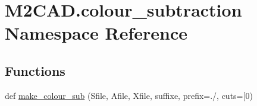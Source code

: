 \hypertarget{namespace_m2_c_a_d_1_1colour__subtraction}{}\section{M2\+C\+A\+D.\+colour\+\_\+subtraction Namespace Reference}
\label{namespace_m2_c_a_d_1_1colour__subtraction}
\subsection*{Functions}
\begin{DoxyCompactItemize}
\item 
def \hyperlink{namespace_m2_c_a_d_1_1colour__subtraction_a5245941117b7e24995d94ef5dd58489a}{make\+\_\+colour\+\_\+sub} (Sfile, Afile, Xfile, suffixe, prefix=\textquotesingle{}./\textquotesingle{}, cuts=\mbox{[}\textquotesingle{}0\textquotesingle{})
\end{DoxyCompactItemize}
